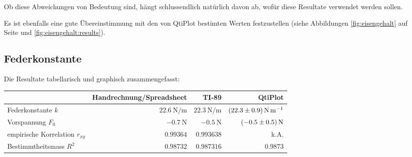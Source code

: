 Ob diese  Abweichungen von Bedeutung sind, h\"angt schlussendlich nat\"urlich
davon ab, wof\"ur diese Resultate verwendet werden sollen.

Es ist  ebenfalls eine  gute \"Ubereinstimmung mit  den von  QtiPlot bestimten
Werten  festzustellen  (siehe   Abbildungen  \ref{fig:eisengehalt}  auf  Seite
\pageref{fig:eisengehalt} und \ref{fig:eisengehalt:results}).


\clearpage
\subsection{Federkonstante}

Die Resultate tabellarisch und graphisch zusammengefasst:

\begin{center}
\begin{tabular}{lrrr}
    \toprule
                                    & Handrechnung/Spreadsheet             & TI-89 & QtiPlot                                \\
    \midrule
    Federkonstante $k$              & $\SI{22.6}{\newton\per\meter}$ & $\SI{22.3}{\newton\per\meter}$ & $\SI{22.3 \pm 0.9}{\newton\per\meter}$ \\
    Vorspannung $F_0$               & $\SI{-0.7}{\newton}$           & $\SI{-0.5}{\newton}$           & $\SI{-0.5 \pm 0.5}{\newton}$           \\
    empirische Korrelation $r_{xy}$ & $0.99364$                       & $0.993638$                     & k.A.                                   \\
    Bestimmtheitsmass $R^2$         & $0.98732$                       & $0.987316$                     & $0.9873$                               \\
    \bottomrule
\end{tabular}
\end{center}

